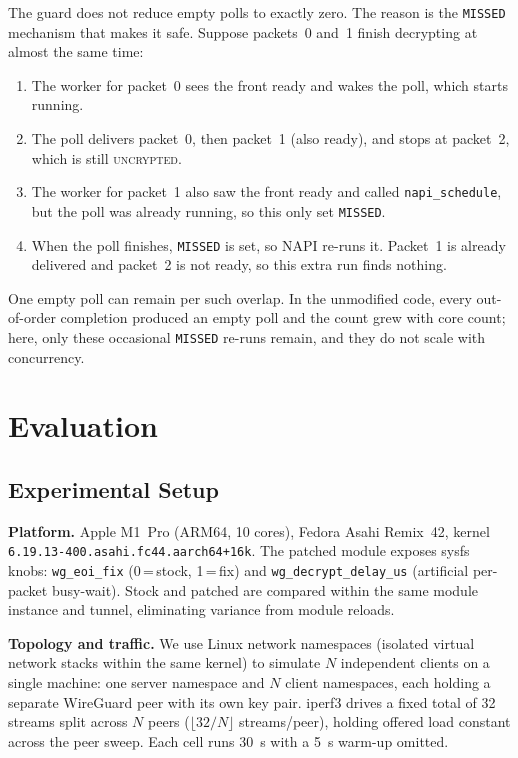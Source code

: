 \documentclass{article}
\begin{document}
The guard does not reduce empty polls to exactly zero. The reason is the
\texttt{MISSED} mechanism that makes it safe. Suppose packets~0 and~1 finish
decrypting at almost the same time:
\begin{enumerate}
  \item The worker for packet~0 sees the front ready and wakes the poll, which
    starts running.
  \item The poll delivers packet~0, then packet~1 (also ready), and stops at
    packet~2, which is still \textsc{uncrypted}.
  \item The worker for packet~1 also saw the front ready and called
    \texttt{napi\_schedule}, but the poll was already running, so this only set
    \texttt{MISSED}.
  \item When the poll finishes, \texttt{MISSED} is set, so NAPI re-runs it.
    Packet~1 is already delivered and packet~2 is not ready, so this extra run
    finds nothing.
\end{enumerate}
One empty poll can remain per such overlap. In the unmodified code, every
out-of-order completion produced an empty poll and the count grew with core
count; here, only these occasional \texttt{MISSED} re-runs remain, and they do
not scale with concurrency.

\section{Evaluation}
\label{sec:eval}

\subsection{Experimental Setup}

\textbf{Platform.} Apple M1~Pro (ARM64, 10 cores), Fedora Asahi Remix~42,
kernel \texttt{6.19.13-400.asahi.fc44.aarch64+16k}. The patched module exposes
sysfs knobs: \texttt{wg\_eoi\_fix} (0\,=\,stock, 1\,=\,fix) and
\texttt{wg\_decrypt\_delay\_us} (artificial per-packet busy-wait). Stock and
patched are compared within the same module instance and tunnel, eliminating
variance from module reloads.

\textbf{Topology and traffic.} We use Linux network namespaces (isolated
virtual network stacks within the same kernel) to simulate $N$ independent
clients on a single machine: one server namespace and $N$ client namespaces,
each holding a separate WireGuard peer with its own key pair. iperf3 drives a
fixed total of 32 streams split across $N$ peers ($\lfloor 32/N \rfloor$
streams/peer), holding offered load constant across the peer sweep. Each cell
runs 30~s with a 5~s warm-up omitted.
\end{document}
